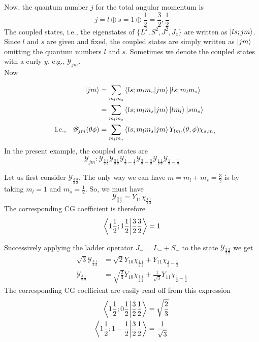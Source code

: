 
Now, the quantum number $j$ for the total angular momentum is
\begin{equation}
j = l \oplus s = 1 \oplus \frac{1}{2} = \frac{3}{2}, \frac{1}{2}
\end{equation}
The coupled states, i.e., the eigenstates of $\{L^2, S^2, J^2, J_z\}$ are written as $\ket{l s; j m}$. Since $l$ and $s$ are given and fixed, the coupled states are simply written as $\ket{j m}$ omitting the quantum numbers $l$ and $s$. Sometimes we denote the coupled states with a curly $y$, e.g., $\mathcal{Y}_{j m}$.\\

Now

\begin{align*}
\ket{j m} &= \sum_{m_l m_s} \braket{l s; m_l m_s}{j m} \ket{l s; m_l m_s} \\
&= \sum_{m_l m_s} \braket{l s; m_l m_s}{j m} \ket{l m_l}\ket{s m_s} \\
\qq{i.e.,}\mathcal{Y}_{j m}\qty(\theta\phi) &= \sum_{m_l m_s} \braket{l s; m_l m_s}{j m} Y_{l m_l}\qty(\theta, \phi) \chi_{s,m_s}
\end{align*}
In the present example, the coupled states are
\begin{equation}
\mathcal{Y}_{j m} :
\mathcal{Y}_{\frac{3}{2}\frac{3}{2}}
\mathcal{Y}_{\frac{3}{2}\frac{1}{2}}
\mathcal{Y}_{\frac{3}{2}-\frac{1}{2}}
\mathcal{Y}_{\frac{3}{2}-\frac{3}{2}}
\mathcal{Y}_{\frac{1}{2}\frac{1}{2}}
\mathcal{Y}_{\frac{1}{2}-\frac{1}{2}}
\end{equation}

Let us first consider $\mathcal{Y}_{\frac{3}{2}\frac{3}{2}}$. The only way we can have $m=m_l + m_s = \frac{3}{2}$ is by taking $m_l= 1$ and $m_s = \frac{1}{2}$. So, we must have
\begin{equation}
\label{chapter19.eqn1-spin-orbit}
\mathcal{Y}_{\frac{3}{2}\frac{3}{2}} = Y_{1 1}\chi_{\frac{1}{2}\frac{1}{2}}
\end{equation}
The corresponding CG coefficient is therefore
\begin{equation*}
\braket{1 \frac{1}{2};1 \frac{1}{2}}{\frac{3}{2}\frac{3}{2}} = 1
\end{equation*}

Successively applying the ladder operator $J_{-} = L_{-} + S_{-}$ to the state $\mathcal{Y}_{\frac{3}{2}\frac{3}{2}}$ we get
\begin{align}
\sqrt{3} \mathcal{Y}_{\frac{3}{2}\frac{1}{2}} 
&= \sqrt{2} Y_{1 0}\chi_{\frac{1}{2}\frac{1}{2}} + Y_{1 1}\chi_{\frac{1}{2}-\frac{1}{2}} \nonumber\\
\mathcal{Y}_{\frac{3}{2}\frac{1}{2}} 
&= \sqrt{\frac{2}{3}} Y_{1 0}\chi_{\frac{1}{2}\frac{1}{2}} 
+
\frac{1}{\sqrt{3}} Y_{1 1}\chi_{\frac{1}{2}-\frac{1}{2}} \label{chapter19.eqn2-spin-orbit}
\end{align}
The corresponding CG coefficient are easily read off from this expression
\begin{align*}
\braket{1 \frac{1}{2}; 0 \frac{1}{2}}{\frac{3}{2}\frac{1}{2}} &= \sqrt{\frac{2}{3}} \\
\braket{1 \frac{1}{2}; 1 -\frac{1}{2}}{\frac{3}{2}\frac{1}{2}} &= \frac{1}{\sqrt{3}}
\end{align*}

